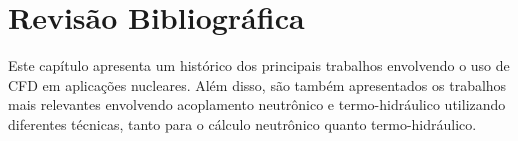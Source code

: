 \chapter{Revisão Bibliográfica}
\label{chap:rev}

Este capítulo apresenta um histórico
dos principais trabalhos envolvendo
o uso de CFD em aplicações nucleares. Além disso, são também apresentados
os trabalhos mais relevantes envolvendo acoplamento neutrônico e
termo-hidráulico utilizando diferentes técnicas, tanto para o cálculo neutrônico
quanto termo-hidráulico.

%




